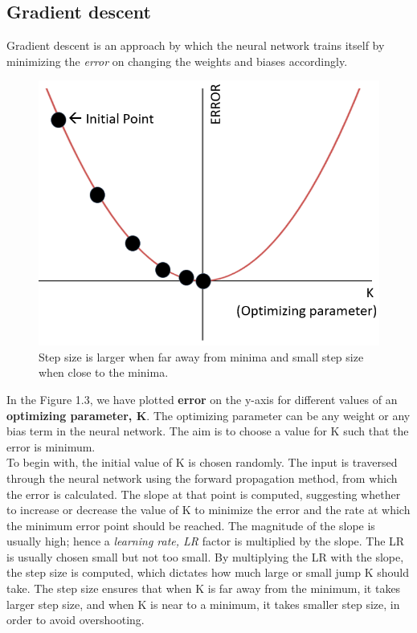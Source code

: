 \documentclass[12pt,a4paper,bold]{thesis}
\theoremstyle{thm}
\theoremstyle{definition}
\begin{document}
\subsection{Gradient descent}
\indent\indent Gradient descent is an approach by which the neural network trains itself by minimizing the \textit{error} on changing the weights and biases accordingly.
\begin{figure}[H]
	\centering
   \includegraphics[scale=0.56]{Images/66.png} 
   \caption{Step size is larger when far away from minima and small step size when close to the minima.}
\end{figure}
\indent In the Figure 1.3, we have plotted \textbf{error} on the y-axis for different values of an \textbf{optimizing parameter, K}. The optimizing parameter can be any weight or any bias term in the neural network. The aim is to choose a value for K such that the error is minimum. \\
\indent To begin with, the initial value of K is chosen randomly. The input is traversed through the neural network using the forward propagation method, from which the error is calculated. The slope at that point is computed, suggesting whether to increase or decrease the value of K to minimize the error and the rate at which the minimum error point should be reached. The magnitude of the slope is usually high; hence a \textit{learning rate, LR} factor is multiplied by the slope. The LR is usually chosen small but not too small. By multiplying the LR with the slope, the step size is computed, which dictates how much large or small jump K should take.
The step size ensures that when K is far away from the minimum, it takes larger step size, and when K is near to a minimum, it takes smaller step size, in order to avoid overshooting. 
\end{document}
